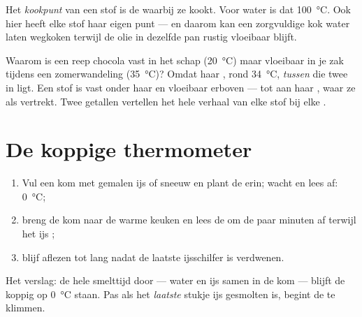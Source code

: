 \begin{definition}[Kookpunt]\label{def:g4:changes-of-state:boiling-point}
Het \emph{kookpunt} van een stof is de 
waarbij ze kookt. Voor water is dat \qty{100}{\celsius}. Ook hier
heeft elke stof haar eigen punt --- en daarom kan een zorgvuldige kok
water laten wegkoken terwijl de olie in dezelfde pan rustig
vloeibaar blijft.
\end{definition}

\begin{example}\label{ex:g4:changes-of-state:reading}
Waarom is een reep chocola vast in het schap (\qty{20}{\celsius}) maar
vloeibaar in je zak tijdens een zomerwandeling (\qty{35}{\celsius})?
Omdat haar , rond \qty{34}{\celsius}, \emph{tussen} die twee
in ligt. Een stof is vast onder haar  en vloeibaar
erboven --- tot aan haar , waar ze als  vertrekt. Twee
getallen vertellen het hele verhaal van elke stof bij elke
.
\end{example}

\section{De koppige thermometer}

\begin{method}\label{met:g4:changes-of-state:watch}
\begin{enumerate}
  \item Vul een kom met gemalen ijs of sneeuw en plant de
         erin; wacht en lees af: \qty{0}{\celsius};
  \item breng de kom naar de warme keuken en lees de  om
        de paar minuten af terwijl het ijs ;
  \item blijf aflezen tot lang nadat de laatste ijsschilfer is
        verdwenen.
\end{enumerate}
Het verslag: de hele smelttijd door --- water en ijs samen in de kom
--- blijft de  koppig op \qty{0}{\celsius} staan. Pas als het
\emph{laatste} stukje ijs gesmolten is, begint de  te
klimmen.
\end{method}

